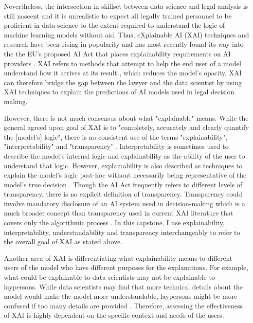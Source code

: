 \documentclass[11pt]{article}
\begin{document}
Nevertheless, the intersection in skillset between data science and legal analysis is still nascent and it is unrealistic to expect all legally trained personnel to be proficient in data science to the extent required to understand the logic of machine learning models without aid. Thus, eXplainable AI (XAI) techniques and research have been rising in popularity and has most recently found its way into the the EU's proposed AI Act that places explainability requirements on AI providers \cite{gyevnar2023}. XAI refers to methods that attempt to help the end user of a model understand how it arrives at its result \cite{danilevsky2020}, which reduces the model's opacity. XAI can therefore bridge the gap between the lawyer and the data scientist by using XAI techniques to explain the predictions of AI models used in legal decision making. 

However, there is not much consensus about what "explainable" means. While the general agreed upon goal of XAI is to "completely, accurately and clearly quantify the [model's] logic", there is no consistent use of the terms "explainability", "interpretability" and "transparency" \cite{danilevsky2020}. Interpretability is sometimes used to describe the model's internal logic and explainability as the ability of the user to understand that logic. However, explainability is also described as techniques to explain the model's logic post-hoc without necessarily being representative of the model's true decision \cite{rosenfeld2021}. Though the AI Act frequently refers to different levels of transparency, there is no explicit definition of transparency. Transparency could involve mandatory disclosure of an AI system used in decision-making which is a much broader concept than transparency used in current XAI literature that covers only the algorithmic process \cite{gyevnar2023}. In this capstone, I use explainability, interpretability, understandability and transparency interchangeably to refer to the overall goal of XAI as stated above.

Another area of XAI is differentiating what explainability means to different users of the model who have different purposes for the explanations. For example, what could be explainable to data scientists may not be explainable to laypersons. While data scientists may find that more technical details about the model would make the model more understandable, laypersons might be more confused if too many details are provided \cite{rosenfeld2021}. Therefore, assessing the effectiveness of XAI is highly dependent on the specific context and needs of the users. 
\end{document}
